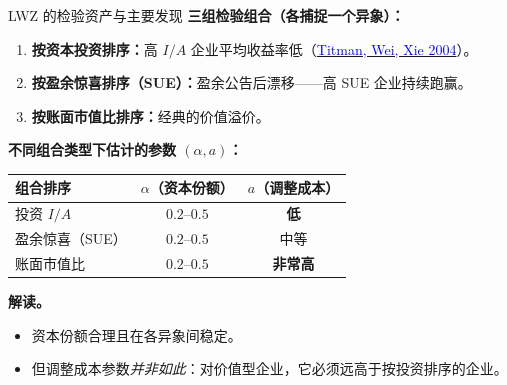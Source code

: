 \documentclass{beamer}
\begin{document}
\begin{frame}{LWZ 的检验资产与主要发现}
    \textbf{三组检验组合（各捕捉一个异象）：}
    \begin{enumerate}
        \item \textbf{按资本投资排序：}高 $I/A$ 企业平均收益率低（\href{https://doi.org/10.1111/j.1540-6261.2004.00709.x}{\textcolor{blue}{Titman, Wei, Xie 2004}}）。
        \item \textbf{按盈余惊喜排序（SUE）：}盈余公告后漂移——高 SUE 企业持续跑赢。
        \item \textbf{按账面市值比排序：}经典的价值溢价。
    \end{enumerate}

    \vspace{0.2cm}
    \textbf{不同组合类型下估计的参数 $(\alpha, a)$：}
    \small
    \begin{center}
        \begin{tabular}{@{}lcc@{}}
            \toprule
            \textbf{组合排序} & $\alpha$（资本份额） & $a$（调整成本） \\
            \midrule
            投资 $I/A$ & $0.2$--$0.5$ & \textbf{低} \\
            盈余惊喜（SUE） & $0.2$--$0.5$ & 中等 \\
            账面市值比 & $0.2$--$0.5$ & \textbf{非常高} \\
            \bottomrule
        \end{tabular}
    \end{center}

    \vspace{0.1cm}
    \textbf{解读。}
    \begin{itemize}
        \item 资本份额合理且在各异象间稳定。
        \item 但调整成本参数\textit{并非如此}：对价值型企业，它必须远高于按投资排序的企业。
    \end{itemize}
\end{frame}
\end{document}
